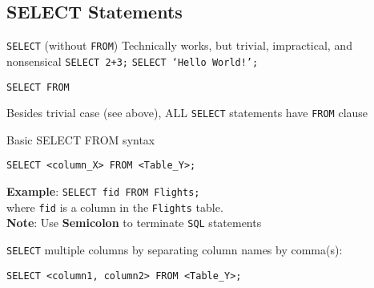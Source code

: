 \documentclass{article}
\begin{document}
\subsection*{SELECT Statements}
\begin{outline}

        \1 \texttt{SELECT} (without \texttt{FROM})
                \2 Technically works, but trivial, impractical, and nonsensical
                \2 \texttt{SELECT 2+3;}
                \2\texttt{SELECT `Hello World!';}
               


         \1 \texttt{SELECT FROM}
                
                
            \2 Besides trivial case (see above), ALL \texttt{SELECT}  statements have \texttt{FROM} clause
                
                
                
            \2 Basic SELECT FROM syntax

\1[]                
\begin{lstlisting}[belowskip=-1.5 \baselineskip]  
SELECT <column_X> FROM <Table_Y>;
\end{lstlisting}                        


\textbf{Example}:  \texttt{SELECT fid FROM Flights;}\\
where \texttt{fid} is a column in the \texttt{Flights} table. \\
                
                
                
            \2 \textbf{Note}: Use \textbf{Semicolon} to terminate \texttt{SQL}  statements
                 
              
              
              
 
 
 
             
              
              
              
              
              


                \1 \texttt{SELECT} multiple columns by separating column names by comma(s): 
                
\begin{lstlisting}[belowskip=-1.5 \baselineskip]  
SELECT <column1, column2> FROM <Table_Y>;
\end{lstlisting} 
                

\end{outline}
\end{document}
